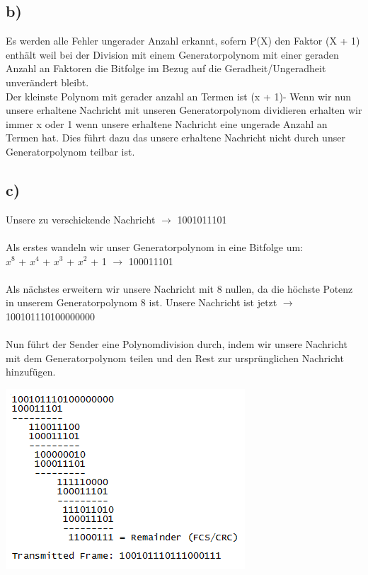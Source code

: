 \documentclass[a4paper,12pt]{scrartcl}
\begin{document}
\subsection{b)}
Es werden alle Fehler ungerader Anzahl erkannt, sofern P(X) den Faktor (X + 1) enthält weil bei der Division mit einem Generatorpolynom mit einer geraden Anzahl an Faktoren die Bitfolge im Bezug auf die Geradheit/Ungeradheit unverändert bleibt.\\
Der kleinste Polynom mit gerader anzahl an Termen ist (x + 1)- Wenn wir nun unsere erhaltene Nachricht mit unseren Generatorpolynom dividieren erhalten wir immer x oder 1 wenn unsere erhaltene Nachricht eine ungerade Anzahl an Termen hat. Dies führt dazu das unsere erhaltene Nachricht nicht durch unser Generatorpolynom teilbar ist.
\subsection{c)}
Unsere zu verschickende Nachricht $\rightarrow$ 1001011101\\\\
Als erstes wandeln wir unser Generatorpolynom in eine Bitfolge um:\\
$x^8$ + $x^4$ + $x^3$ + $x^2$ + 1 $\rightarrow$ 100011101\\\\
Als nächstes erweitern wir unsere Nachricht mit 8 nullen, da die höchste Potenz in unserem Generatorpolynom 8 ist. Unsere Nachricht ist jetzt $\rightarrow$ 100101110100000000\\\\
Nun führt der Sender eine Polynomdivision durch, indem wir unsere Nachricht mit dem Generatorpolynom teilen und den Rest zur ursprünglichen Nachricht hinzufügen.\\
\begin{center}
\includegraphics{./images/Aufgabe8c-sender}\\
\end{center}
\end{document}
